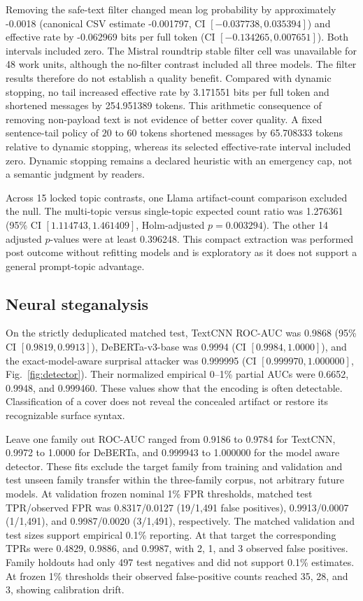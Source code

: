 \documentclass[fleqn,10pt]{wlscirep}
\begin{document}
Removing the safe-text filter changed mean log probability by approximately -0.0018 (canonical CSV estimate -0.001797, CI \([-0.037738, 0.035394]\)) and effective rate by -0.062969 bits per full token (CI \([-0.134265, 0.007651]\)). Both intervals included zero. The Mistral roundtrip stable filter cell was unavailable for 48 work units, although the no-filter contrast included all three models. The filter results therefore do not establish a quality benefit.
Compared with dynamic stopping, no tail increased effective rate by 3.171551 bits per full token and shortened messages by 254.951389 tokens. This arithmetic consequence of removing non-payload text is not evidence of better cover quality. A fixed sentence-tail policy of \(20\) to \(60\) tokens shortened messages by 65.708333 tokens relative to dynamic stopping, whereas its selected effective-rate interval included zero. Dynamic stopping remains a declared heuristic with an emergency cap, not a semantic judgment by readers.

Across 15 locked topic contrasts, one Llama artifact-count comparison excluded the null. The multi-topic versus single-topic expected count ratio was 1.276361 (95\% CI \([1.114743, 1.461409]\), Holm-adjusted \(p=0.003294\)). The other 14 adjusted \(p\)-values were at least 0.396248. This compact extraction was performed post outcome without refitting models and is exploratory as it does not support a general prompt-topic advantage.



\subsection*{Neural steganalysis}\label{sec:results-detector}

On the strictly deduplicated matched test, TextCNN ROC-AUC was 0.9868 (95\% CI \([0.9819,0.9913]\)), DeBERTa-v3-base was 0.9994 (CI \([0.9984,1.0000]\)), and the exact-model-aware surprisal attacker was 0.999995 (CI \([0.999970,1.000000]\), Fig.~\ref{fig:detector}). Their normalized empirical 0--1\% partial AUCs were 0.6652, 0.9948, and 0.999460. These values show that the encoding is often detectable. Classification of a cover does not reveal the concealed artifact or restore its recognizable surface syntax.

Leave one family out ROC-AUC ranged from 0.9186 to 0.9784 for TextCNN, 0.9972 to 1.0000 for DeBERTa, and 0.999943 to 1.000000 for the model aware detector. These fits exclude the target family from training and validation and test unseen family transfer within the three-family corpus, not arbitrary future models. At validation frozen nominal 1\% FPR thresholds, matched test TPR/observed FPR was 0.8317/0.0127 (19/1,491 false positives), 0.9913/0.0007 (1/1,491), and 0.9987/0.0020 (3/1,491), respectively. The matched validation and test sizes support empirical 0.1\% reporting. At that target the corresponding TPRs were 0.4829, 0.9886, and 0.9987, with 2, 1, and 3 observed false positives. Family holdouts had only 497 test negatives and did not support 0.1\% estimates. At frozen 1\% thresholds their observed false-positive counts reached 35, 28, and 3, showing calibration drift.
\end{document}
